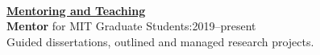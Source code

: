 \documentclass[letterpaper,11pt]{article}
\newcounter{confs}
\newcommand{\talk}[2]{ \begin{tabular}{Aab}\stepcounter{confs}\theconfs.&#1&#2\end{tabular}}
\begin{document}
\\
\underline{\textbf{Mentoring and Teaching}}\\
\textbf{Mentor} for MIT Graduate Students:\hfill2019--present\\
\indent Guided dissertations, outlined and managed research projects.
\end{document}
